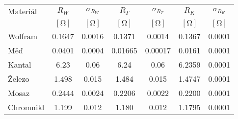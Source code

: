 \begin{tabular}{lSSSSSS}                                                                                                    \toprule
Materiál  & {$R_W$}         & {$\sigma_{R_W}$} & {$R_T$}         & {$\sigma_{R_T}$} & {$R_K$}         & {$\sigma_{R_K}$} \\
          & {$[\si{\ohm}]$} & {$[\si{\ohm}]$}  & {$[\si{\ohm}]$} & {$[\si{\ohm}]$}  & {$[\si{\ohm}]$} & {$[\si{\ohm}]$}  \\ \midrule
Wolfram   & 0.1647          & 0.0016           & 0.1371          & 0.0014           & 0.1367          & 0.0001           \\
Měď       & 0.0401          & 0.0004           & 0.01665         & 0.00017          & 0.0161          & 0.0001           \\
Kantal    & 6.23            & 0.06             & 6.24            & 0.06             & 6.2359          & 0.0001           \\
Železo    & 1.498           & 0.015            & 1.484           & 0.015            & 1.4747          & 0.0001           \\
Mosaz     & 0.2444          & 0.0024           & 0.2206          & 0.0022           & 0.2200          & 0.0001           \\
Chromnikl & 1.199           & 0.012            & 1.180           & 0.012            & 1.1795          & 0.0001           \\ \bottomrule
\end{tabular}